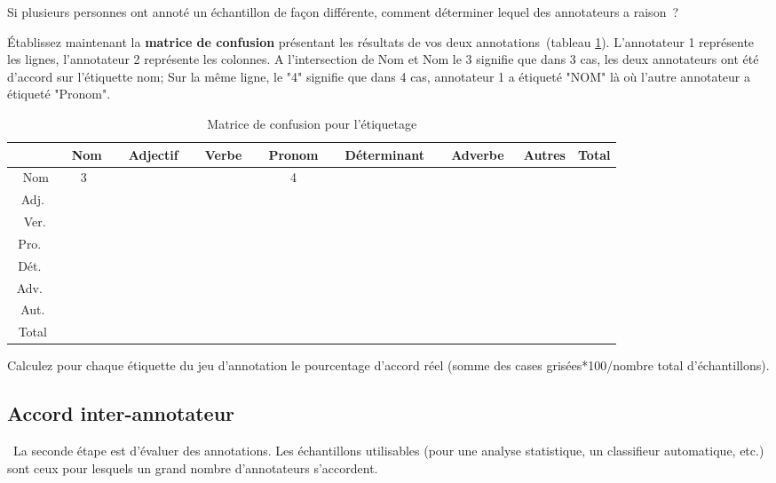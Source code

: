   Si plusieurs personnes ont annoté un échantillon de façon différente, comment déterminer lequel des annotateurs a raison ?

 Établissez maintenant la \textbf{matrice de confusion} présentant les résultats de vos deux annotations (tableau \ref{matrice}). L'annotateur 1 représente les lignes, l'annotateur 2 représente les colonnes. A l'intersection de Nom et Nom le 3 signifie que dans 3 cas, les deux annotateurs ont été d'accord sur l'étiquette nom; Sur la même ligne, le "4" signifie que dans 4 cas, annotateur 1 a étiqueté "NOM" là où l'autre annotateur a étiqueté "Pronom".


\begin{small}
\begin{table}[h]
\begin{tabular}{c|c|c|c|c|c|c|c|c}
 & Nom & Adjectif & Verbe & Pronom & Déterminant & Adverbe & Autres&Total\\
\hline
 Nom &\cellcolor{lightgray}3 &	&	&4	&	&	&&\\
\hline
Adj.&	&\cellcolor{lightgray}	&	&	&	&	&&\\ 
Ver. 	&	&	&\cellcolor{lightgray}	&	&	&	&&\\
\hline
Pro. &	&	&	&\cellcolor{lightgray}	&	&	&\\
\hline
Dét. &	&	&	&	&\cellcolor{lightgray}	&	&\\
\hline
Adv. &	&	&	&	&	&\cellcolor{lightgray}	&\\
\hline
Aut.  &	&	&	&	&	&	&\cellcolor{lightgray}\\
\hline
\hline
Total	&	&	&	&	&	&	&\\
\end{tabular}
\caption{\label{matrice} Matrice de confusion pour l'étiquetage}
\end{table}
\end{small}
Calculez pour chaque étiquette du jeu d'annotation le pourcentage d'accord réel (somme des cases grisées*100/nombre total d'échantillons).

  \subsection{ Accord inter-annotateur}

 La seconde étape est d'évaluer des annotations. Les échantillons utilisables (pour une analyse statistique, un classifieur automatique, etc.) sont ceux pour lesquels un grand nombre d'annotateurs s'accordent.

